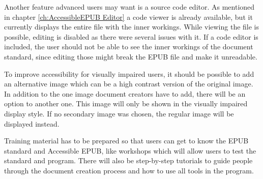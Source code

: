 Another feature advanced users may want is a source code editor. As mentioned in chapter \ref{ch:AccessibleEPUB Editor} a code viewer is already available, but it currently displays the entire file with the inner workings. While viewing the file is possible, editing is disabled as there were several issues with it. If a code editor is included, the user should not be able to see the inner workings of the document standard, since editing those might break the EPUB file and make it unreadable. 

To improve accessibility for visually impaired users, it should be possible to add an alternative image which can be a high contrast version of the original image. In addition to the one image document creators have to add, there will be an option to another one. This image will only be shown in the visually impaired display style. If no secondary image was chosen, the regular image will be displayed instead.

Training material has to be prepared so that users can get to know the EPUB standard and Accessible EPUB, like workshops which will allow users to test the standard and program. There will also be step-by-step tutorials to guide people through the document creation process and how to use all tools in the program.


